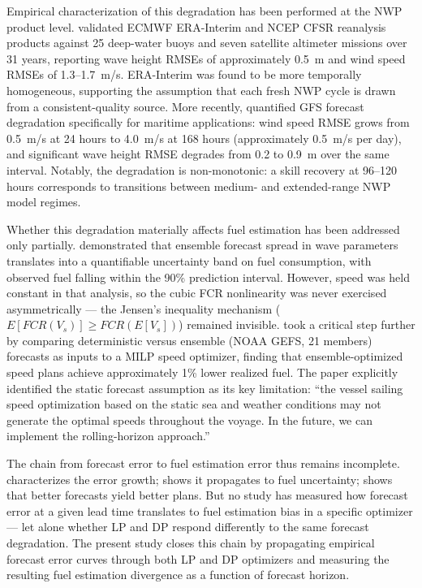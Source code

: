 \documentclass[review,authoryear]{elsarticle}  %
\begin{document}
Empirical characterization of this degradation has been performed at the NWP product level. \citet{Stopa2014} validated ECMWF ERA-Interim and NCEP CFSR reanalysis products against 25 deep-water buoys and seven satellite altimeter missions over 31 years, reporting wave height RMSEs of approximately 0.5~m and wind speed RMSEs of 1.3--1.7~m/s. ERA-Interim was found to be more temporally homogeneous, supporting the assumption that each fresh NWP cycle is drawn from a consistent-quality source. More recently, \citet{Marjanovic2025} quantified GFS forecast degradation specifically for maritime applications: wind speed RMSE grows from 0.5~m/s at 24 hours to 4.0~m/s at 168 hours (approximately 0.5~m/s per day), and significant wave height RMSE degrades from 0.2 to 0.9~m over the same interval. Notably, the degradation is non-monotonic: a skill recovery at 96--120 hours corresponds to transitions between medium- and extended-range NWP model regimes.

Whether this degradation materially affects fuel estimation has been addressed only partially. \citet{Vettor2022} demonstrated that ensemble forecast spread in wave parameters translates into a quantifiable uncertainty band on fuel consumption, with observed fuel falling within the 90\% prediction interval. However, speed was held constant in that analysis, so the cubic FCR nonlinearity was never exercised asymmetrically --- the Jensen's inequality mechanism ($E[FCR(V_s)] \geq FCR(E[V_s])$) remained invisible. \citet{Luo2023} took a critical step further by comparing deterministic versus ensemble (NOAA GEFS, 21 members) forecasts as inputs to a MILP speed optimizer, finding that ensemble-optimized speed plans achieve approximately 1\% lower realized fuel. The paper explicitly identified the static forecast assumption as its key limitation: ``the vessel sailing speed optimization based on the static sea and weather conditions may not generate the optimal speeds throughout the voyage. In the future, we can implement the rolling-horizon approach.''

The chain from forecast error to fuel estimation error thus remains incomplete. \citet{Marjanovic2025} characterizes the error growth; \citet{Vettor2022} shows it propagates to fuel uncertainty; \citet{Luo2023} shows that better forecasts yield better plans. But no study has measured how forecast error at a given lead time translates to fuel estimation bias in a specific optimizer --- let alone whether LP and DP respond differently to the same forecast degradation. The present study closes this chain by propagating empirical forecast error curves through both LP and DP optimizers and measuring the resulting fuel estimation divergence as a function of forecast horizon.
\end{document}
